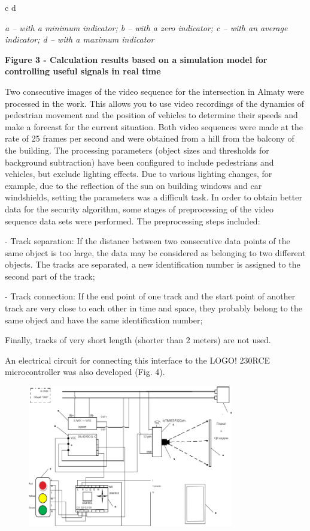 c d

\emph{a -- with a minimum indicator; b -- with a zero indicator; c --
with an average indicator; d -- with a maximum indicator}

\textbf{Figure 3 - Calculation results based on a simulation model for
controlling useful signals in real time}

Two consecutive images of the video sequence for the intersection in
Almaty were processed in the work. This allows you to use video
recordings of the dynamics of pedestrian movement and the position of
vehicles to determine their speeds and make a forecast for the current
situation. Both video sequences were made at the rate of 25 frames per
second and were obtained from a hill from the balcony of the building.
The processing parameters (object sizes and thresholds for background
subtraction) have been configured to include pedestrians and vehicles,
but exclude lighting effects. Due to various lighting changes, for
example, due to the reflection of the sun on building windows and car
windshields, setting the parameters was a difficult task. In order to
obtain better data for the security algorithm, some stages of
preprocessing of the video sequence data sets were performed. The
preprocessing steps included:

- Track separation: If the distance between two consecutive data points
of the same object is too large, the data may be considered as belonging
to two different objects. The tracks are separated, a new identification
number is assigned to the second part of the track;

- Track connection: If the end point of one track and the start point of
another track are very close to each other in time and space, they
probably belong to the same object and have the same identification
number;

Finally, tracks of very short length (shorter than 2 meters) are not
used.

An electrical circuit for connecting this interface to the LOGO! 230RCE
microcontroller was also developed (Fig. 4).

\begin{figure}[H]
	\centering
	\includegraphics[width=0.8\textwidth]{assets/77}
	\caption*{}
\end{figure}

